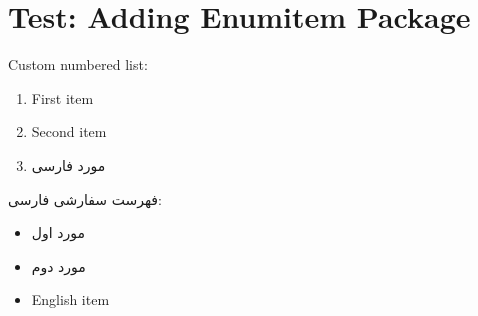 \documentclass[12pt,a4paper]{article}
\newcommand{\fa}[1]{\textfarsi{#1}}
\newcommand{\en}[1]{\textenglish{#1}}
\begin{document}
\section*{Test: Adding Enumitem Package}

\en{Custom numbered list:}
\begin{enumerate}[label=(\arabic*)]
\item \en{First item}
\item \en{Second item}
\item \fa{مورد فارسی}
\end{enumerate}

\fa{فهرست سفارشی فارسی:}
\begin{itemize}[label=\textbullet]
\item \fa{مورد اول}
\item \fa{مورد دوم}
\item \en{English item}
\end{itemize}
\end{document}
